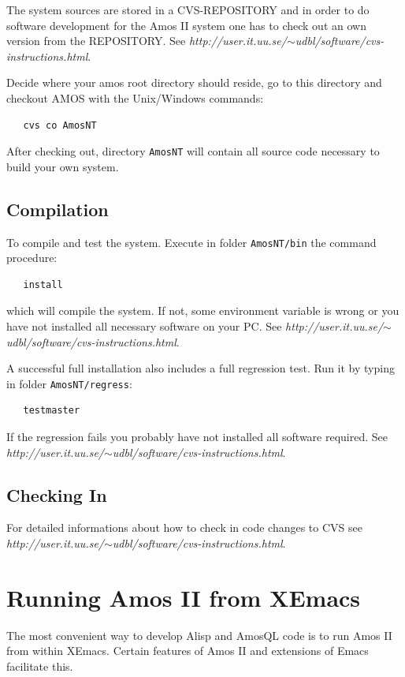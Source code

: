 The system sources are stored in a CVS-REPOSITORY and in order to do
software development for the Amos II system one has to check out an
own version from the REPOSITORY. See {\em
http://user.it.uu.se/$\sim$udbl/software/cvs-instructions.html}.

Decide where your amos root directory should reside, go to this
directory and checkout AMOS with the Unix/Windows commands:
\begin{verbatim}
   cvs co AmosNT
\end{verbatim}

After checking out, directory {\tt AmosNT} will contain all source
code necessary to build your own system.

\subsection{Compilation}
\label{compilation}

To compile and test the system. Execute in folder {\tt AmosNT/bin} the
command procedure:
\begin{verbatim}
   install
\end{verbatim}
which will compile the system. If not, some environment variable is
wrong or you have not installed all necessary software on your PC. See
{\em http://user.it.uu.se/$\sim$udbl/software/cvs-instructions.html}.

A successful full installation also includes a full regression test. Run it by
typing in folder {\tt AmosNT/regress}:
\begin{verbatim}
   testmaster
\end{verbatim}
If the regression fails you probably have not installed all software
required.  See {\em
http://user.it.uu.se/$\sim$udbl/software/cvs-instructions.html}.

\subsection{Checking In}

For detailed informations about how to check in code changes to CVS see
{\em http://user.it.uu.se/$\sim$udbl/software/cvs-instructions.html}.


\section{Running Amos II from XEmacs}

The most convenient way to develop Alisp and AmosQL code is to run
Amos II from within XEmacs. Certain features of Amos II and extensions
of Emacs facilitate this.

